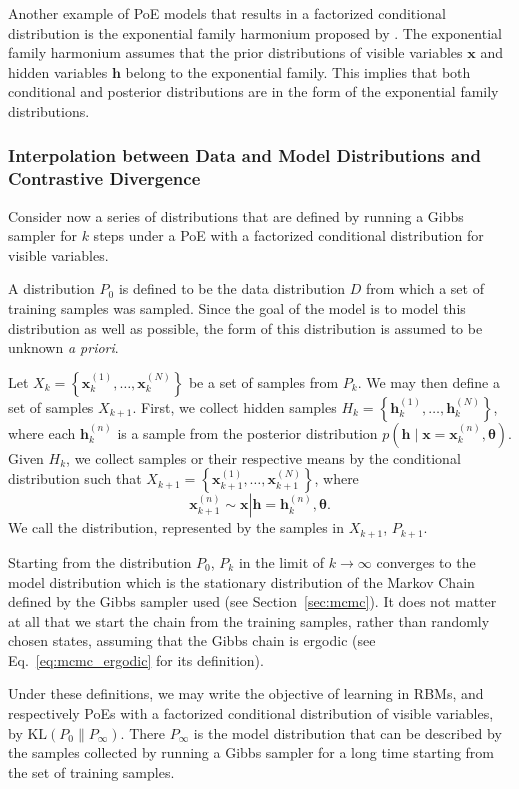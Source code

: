 \documentclass{now}
\newcommand{\vect}[1]{\mathbf{#1}}
\newcommand{\vects}[1]{\boldsymbol{#1}}
\newcommand{\vh}[0]{\vect{h}}
\newcommand{\vx}[0]{\vect{x}}
\newcommand{\TT}[0]{{\vects{\theta}}}
\newcommand{\KL}[0]{\text{KL}}
\begin{document}
Another example of PoE models that results in a factorized conditional
distribution is the exponential family harmonium proposed by
\citet{Welling2005}. The exponential family harmonium assumes that the prior
distributions of visible variables $\vx$ and hidden variables $\vh$ belong to
the exponential family. This implies that both conditional and posterior
distributions are in the form of the exponential family distributions.

\subsubsection{Interpolation between Data and Model Distributions and
Contrastive Divergence}
\label{sec:contrastive_divergence}

Consider now a series of distributions that are defined by running a Gibbs
sampler for $k$ steps under a PoE with a factorized conditional distribution for
visible variables. 

A distribution $P_0$ is defined to be the data distribution $D$ from which a set
of training samples was sampled. Since the goal of the model is to model this
distribution as well as possible, the form of this distribution is assumed to be
unknown \textit{a priori}. 

Let $X_k = \left\{ \vx_k^{(1)}, \dots, \vx_k^{(N)} \right\}$ be a set of samples
from $P_k$. We may then define a set of samples $X_{k+1}$. First, we collect
hidden samples $H_k = \left\{ \vh_k^{(1)}, \dots, \vh_k^{(N)} \right\}$, where
each $\vh_k^{(n)}$ is a sample from the posterior distribution $p(\vh \mid \vx =
\vx_k^{(n)}, \TT)$.  Given $H_k$, we collect samples or their respective means
by the conditional distribution such that $X_{k+1} = \left\{ \vx_{k+1}^{(1)},
\dots, \vx_{k+1}^{(N)}\right\}$, where
\[
\vx_{k+1}^{(n)} \sim \vx \left| \vh = \vh_k^{(n)}, \TT.  \right.
\]
We call the distribution, represented by the samples in $X_{k+1}$, $P_{k+1}$.

Starting from the distribution $P_0$, $P_{k}$ in the limit of $k \to \infty$
converges to the model distribution which is the stationary distribution of the
Markov Chain defined by the Gibbs sampler used (see Section~\ref{sec:mcmc}). It
does not matter at all that we start the chain from the training samples, rather
than randomly chosen states, assuming that the Gibbs chain is ergodic (see
Eq.~\eqref{eq:mcmc_ergodic} for its definition). 

Under these definitions, we may write the objective of learning in RBMs, and
respectively PoEs with a factorized conditional distribution of visible
variables, by $\KL(P_0 \| P_\infty)$. There $P_\infty$ is the model distribution
that can be described by the samples collected by running a Gibbs sampler for a
long time starting from the set of training samples.
\end{document}
